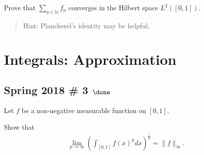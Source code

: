Prove that \(\sum_{n\in {\mathbb{N}}} f_n\) converges in the Hilbert
space \(L^2([0, 1])\).

\begin{quote}
Hint: Plancherel's identity may be helpful.
\end{quote}

\hypertarget{integrals-approximation}{%
\section{Integrals: Approximation}\label{integrals-approximation}}

\hypertarget{spring-2018-3-done}{%
\subsection{\texorpdfstring{Spring 2018 \# 3
\(\done\)}{Spring 2018 \# 3 \textbackslash done}}\label{spring-2018-3-done}}

Let \(f\) be a non-negative measurable function on \([0, 1]\).

Show that
\begin{align*}
\lim _{p \rightarrow \infty}\left(\int_{[0,1]} f(x)^{p} d x\right)^{\frac{1}{p}}=\|f\|_{\infty}.
\end{align*}

